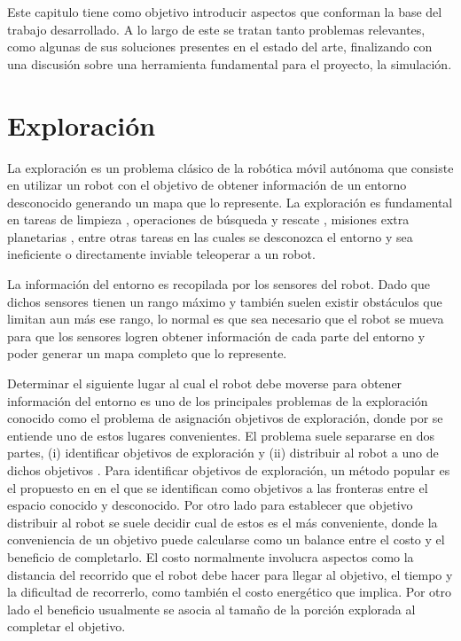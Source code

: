 Este capitulo tiene como objetivo introducir aspectos que conforman la base del
trabajo desarrollado. A lo largo de este se tratan tanto problemas relevantes,
como algunas de sus soluciones presentes en el estado del arte, finalizando con
una discusión sobre una herramienta fundamental para el proyecto, la
simulación.

\section{Exploración}\label{sec:exploracion}
La exploración es un problema clásico de la robótica
móvil autónoma que consiste en utilizar un robot con el objetivo de obtener
información de un entorno desconocido generando un mapa que lo represente. La
exploración es fundamental en tareas de limpieza \cite{luo2002real}, operaciones
de búsqueda y rescate \cite{Liu2015}, misiones extra planetarias
\cite{schuster2019towards}, entre otras tareas en las cuales se desconozca
el entorno y sea ineficiente o directamente inviable teleoperar a un robot.

La información del entorno es recopilada por los sensores del robot. Dado que
dichos sensores tienen un rango máximo y también suelen existir obstáculos que
limitan aun más ese rango, lo normal es que sea necesario que el robot se mueva
para que los sensores logren obtener información de cada parte del entorno y
poder generar un mapa completo que lo represente.

Determinar el siguiente lugar al cual el robot debe moverse para obtener
información del entorno es uno de los principales problemas de la exploración
conocido como el problema de asignación objetivos de exploración, donde por
 se entiende uno de estos lugares convenientes. El
problema suele separarse en dos partes, (i) identificar objetivos de
exploración y (ii) distribuir al robot a uno de dichos objetivos
\cite{wurm2008coordinated}. Para identificar objetivos de exploración, un
método popular es el propuesto en \cite{yamauchi1998frontier} en el que se
identifican como objetivos a las fronteras entre el espacio conocido y
desconocido. Por otro lado para establecer que objetivo distribuir al robot se
suele decidir cual de estos es el más conveniente, donde la conveniencia de un
objetivo puede calcularse como un balance entre el costo y el beneficio de
completarlo. El costo normalmente involucra aspectos como la distancia del
recorrido que el robot debe hacer para llegar al objetivo, el tiempo y la
dificultad de recorrerlo, como también el costo energético que implica. Por
otro lado el beneficio usualmente se asocia al tamaño de la porción explorada
al completar el objetivo. 

